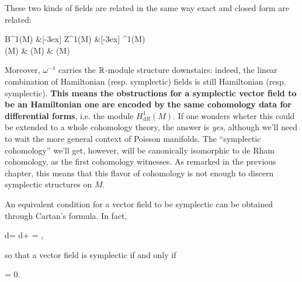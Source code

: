\documentclass[main.tex]{subfiles}
\begin{document}
\begin{remark}
\label{rmk:symp_cohomology_is_dr_cohomology}
	These two kinds of fields are related in the same way exact and closed form are related:
	\begin{diagram}
	\label{diag:ham_symp_fields_inclusions}
		B^1(M)   \&[-3ex] Z^1(M)   \&[-3ex] \Omega^1(M) \\
		\hamfields(M)  \& \sympfields(M)  \& \fields(M)
	\end{diagram}
	Moreover, $\omega^{-1}$ carries the $\mathbb{R}$-module structure downstairs: indeed, the linear combination of Hamiltonian (resp. symplectic) fields is still Hamiltonian (resp. symplectic). \textbf{This means the obstructions for a symplectic vector field to be an Hamiltonian one are encoded by the same cohomology data for differential forms}, i.e. the module $H^1_{dR}(M)$. If one wonders wheter this could be extended to a whole cohomology theory, the answer is \emph{yes}, although we'll need to wait the more general context of Poisson manifolds. The ``symplectic cohomology'' we'll get, however, will be canonically isomorphic to de Rham cohomology, as the first cohomology witnesses. As remarked in the previous chapter, this means that this flavor of cohomology is not enough to discern symplectic structures on $M$.
\end{remark}

\begin{remark}
\label{rmk:omega_is_const_on_symp_fields}
	An equivalent condition for a vector field to be symplectic can be obtained through Cartan's formula. In fact,
	\begin{eqalign}
		d\omega = d\omega +  = \omega,
	\end{eqalign}
	so that a vector field is symplectic if and only if
	\begin{eqalign}
		 \omega = 0.
	\end{eqalign}
\end{remark}
\end{document}
